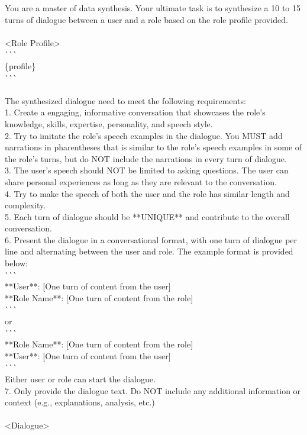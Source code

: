 \begin{figure*}
\begin{tcolorbox}[
    colback=gray!10,      %
    colframe=gray!80,     %
    title=Synthesis Prompt for Free Chats,
    fonttitle=\bfseries,  %
    rounded corners,
    boxrule=0.5mm,        %
    width=\linewidth
]
\scriptsize

You are a master of data synthesis. Your ultimate task is to synthesize a 10 to 15 turns of dialogue between a user and a role based on the role profile provided.\\
\\
<Role Profile>\\
\`{}\`{}\`{}\\
\{profile\}\\
\`{}\`{}\`{}\\
\\
The synthesized dialogue need to meet the following requirements:\\
1. Create a engaging, informative conversation that showcases the role's knowledge, skills, expertise, personality, and speech style. \\
2. Try to imitate the role's speech examples in the dialogue. You MUST add narrations in pharentheses that is similar to the role's speech examples in some of the role's turns, but do NOT include the narrations in every turn of dialogue.\\
3. The user's speech should NOT be limited to asking questions. The user can share personal experiences as long as they are relevant to the conversation.\\
4. Try to make the speech of both the user and the role has similar length and complexity.\\
5. Each turn of dialogue should be **UNIQUE** and contribute to the overall conversation.\\
6. Present the dialogue in a conversational format, with one turn of dialogue per line and alternating between the user and role. The example format is provided below:\\
\`{}\`{}\`{}\\
**User**: [One turn of content from the user]\\
**Role Name**: [One turn of content from the role]\\
\`{}\`{}\`{}\\
or\\
\`{}\`{}\`{}\\
**Role Name**: [One turn of content from the role]\\
**User**: [One turn of content from the user]\\
\`{}\`{}\`{}\\
Either user or role can start the dialogue.\\
7. Only provide the dialogue text. Do NOT include any additional information or context (e.g., explanations, analysis, etc.)\\
\\
<Dialogue>


\end{tcolorbox}
\end{figure*}

